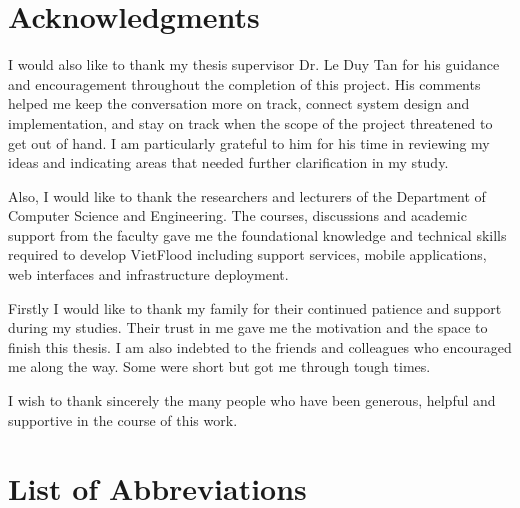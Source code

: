 \documentclass[12pt, twoside]{report}
\begin{document}
\chapter*{Acknowledgments}

I would also like to thank my thesis supervisor Dr. Le Duy Tan for his guidance and encouragement throughout the completion of this project. His comments helped me keep the conversation more on track, connect system design and implementation, and stay on track when the scope of the project threatened to get out of hand. I am particularly grateful to him for his time in reviewing my ideas and indicating areas that needed further clarification in my study.

Also, I would like to thank the researchers and lecturers of the Department of Computer Science and Engineering. The courses, discussions and academic support from the faculty gave me the foundational knowledge and technical skills required to develop VietFlood including support services, mobile applications, web interfaces and infrastructure deployment.

Firstly I would like to thank my family for their continued patience and support during my studies. Their trust in me gave me the motivation and the space to finish this thesis. I am also indebted to the friends and colleagues who encouraged me along the way. Some were short but got me through tough times.

I wish to thank sincerely the many people who have been generous, helpful and supportive in the course of this work.


\thispagestyle{empty}

\tableofcontents
\listoftables
{}
\listoffigures
{}

\newpage 
\chapter*{List of Abbreviations} 
\end{document}
